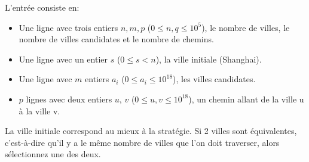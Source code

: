 \begin{Input}
    L'entrée consiste en:
    \begin{itemize}
        \item Une ligne avec trois entiers $n, m, p$ ($0\leq n, q\leq 10^5$), le nombre de villes, le nombre de villes candidates et le nombre de chemins.
        \item Une ligne avec un entier $s$ ($0 \leq s < n$), la ville initiale (Shanghai).
        \item Une ligne avec $m$ entiers $a_i$ ($0  \leq a_i \leq 10^{18}$), les villes candidates.
        \item $p$ lignes avec deux entiers $u$, $v$ ($0 \leq u, v \leq 10^{18}$), un chemin allant de la ville u à la ville v.
    \end{itemize}
\end{Input}

\begin{Output}
    La ville initiale correspond au mieux à la stratégie. Si 2 villes sont équivalentes, c'est-à-dire qu'il y a le même nombre de villes que l'on doit traverser, alors sélectionnez une des deux.
\end{Output}
